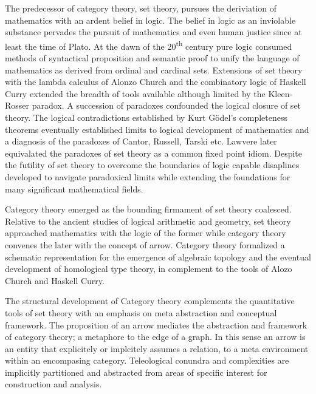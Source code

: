 \documentclass[aps,twocolumn,secnumarabic,nobalancelastpage,amsmath,amssymb,
amsthm,nofootinbib,parskip=full]{revtex4}
\numberwithin{equation}{section}
\begin{document}
The predecessor of category theory, set theory,
pursues the deriviation of mathematics with an ardent belief in logic. 
The belief in logic as an inviolable substance pervades the pursuit of
mathematics and even human justice since at least the time of Plato.
At the dawn of the 20\textsuperscript{th} century 
pure logic consumed methods of syntactical proposition and semantic proof
to unify the language of mathematics as derived from ordinal and cardinal sets. 
Extensions of set theory with the lambda calculus of Alonzo Church
and the combinatory logic of Haskell Curry extended the breadth of
tools available although limited by the Kleen-Rosser paradox.
A succession of paradoxes confounded the logical closure of set theory.
The logical contradictions established by Kurt G\"{o}del's completeness theorems
eventually established limits to logical development of mathematics and
a diagnosis of the paradoxes of Cantor, Russell, Tarski etc.
Lawvere later equivalated the paradoxes of set theory as a
common fixed point idiom.
Despite the futility of set theory to overcome the boundaries of logic
capable disaplines developed to navigate paradoxical limits while
extending the foundations for many significant mathematical fields.

Category theory emerged as the bounding firmament of set theory coalesced.
Relative to the ancient studies of logical arithmetic and geometry,
set theory approached mathematics with the logic of the former while category
theory convenes the later with the concept of arrow.
Category theory formalized a schematic representation for the
emergence of algebraic topology and the eventual development of
homological type theory, in complement to the tools of Alozo Church and
Haskell Curry.

The structural development of 
Category theory complements the quantitative 
tools of set theory with an emphasis on meta abstraction and
conceptual framework.
The proposition of an arrow mediates the abstraction and framework of
category theory; a metaphore to the edge of a graph. In this sense
an arrow is an entity that explicitely or implcitely assumes a relation,
to a meta environment within an encompasing category.
Teleological conundra and complexities are implicitly partitioned and
abstracted from areas of specific interest for construction and analysis.
\end{document}
